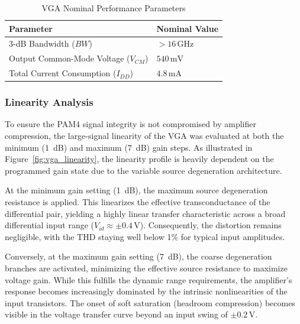 \begin{table}[H]
\centering
\caption{VGA Nominal Performance Parameters}
\label{tab:vga_key_params}
\begin{tabular}{@{}ll@{}}
\toprule
\textbf{Parameter} & \textbf{Nominal Value} \\
\midrule
3-dB Bandwidth ($BW$) & $> 16\,\text{GHz}$ \\
Output Common-Mode Voltage ($V_{CM}$) & $540\,\text{mV}$ \\
Total Current Consumption ($I_{DD}$) & $4.8\,\text{mA}$ \\
\bottomrule
\end{tabular}
\end{table}

\subsubsection*{Linearity Analysis}
To ensure the PAM4 signal integrity is not compromised by amplifier compression, the large-signal linearity of the VGA was evaluated at both the minimum (1~dB) and maximum (7~dB) gain steps. As illustrated in Figure~\ref{fig:vga_linearity}, the linearity profile is heavily dependent on the programmed gain state due to the variable source degeneration architecture.

At the minimum gain setting (1~dB), the maximum source degeneration resistance is applied. This linearizes the effective transconductance of the differential pair, yielding a highly linear transfer characteristic across a broad differential input range ($V_{id} \approx \pm 0.4\,\text{V}$). Consequently, the distortion remains negligible, with the THD staying well below 1\% for typical input amplitudes.

Conversely, at the maximum gain setting (7~dB), the coarse degeneration branches are activated, minimizing the effective source resistance to maximize voltage gain. While this fulfills the dynamic range requirements, the amplifier's response becomes increasingly dominated by the intrinsic nonlinearities of the input transistors. The onset of soft saturation (headroom compression) becomes visible in the voltage transfer curve beyond an input swing of $\pm 0.2\,\text{V}$.

